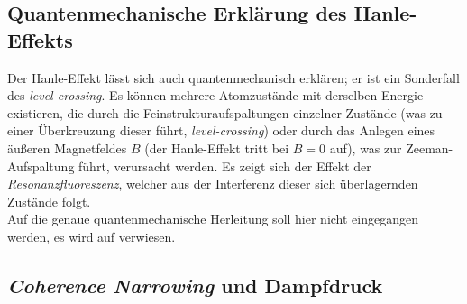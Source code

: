 \subsection{Quantenmechanische Erklärung des Hanle-Effekts}
Der Hanle-Effekt lässt sich auch quantenmechanisch erklären; er ist ein Sonderfall des \emph{level-crossing}. 
Es können mehrere Atomzustände mit derselben Energie existieren, die durch die Feinstrukturaufspaltungen einzelner Zustände (was zu einer Überkreuzung 
dieser führt, \emph{level-crossing}) oder durch das Anlegen eines äußeren Magnetfeldes $B$ (der Hanle-Effekt tritt bei $B=0$ auf), was zur Zeeman-Aufspaltung 
führt, verursacht werden.
Es zeigt sich der Effekt der \emph{Resonanzfluoreszenz}, welcher aus der Interferenz dieser sich überlagernden Zustände folgt. \\
Auf die genaue quantenmechanische Herleitung soll hier nicht eingegangen werden, es wird auf \cite{manual} verwiesen.



\subsection{\emph{Coherence Narrowing} und Dampfdruck}

